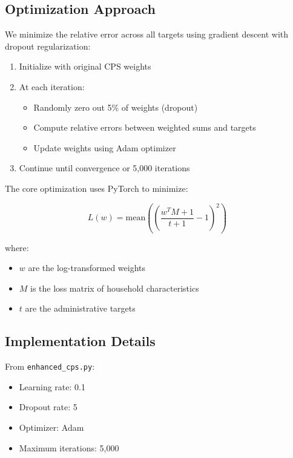 \subsection{Optimization Approach}

We minimize the relative error across all targets using gradient descent with dropout regularization:

\begin{enumerate}
    \item Initialize with original CPS weights
    \item At each iteration:
    \begin{itemize}
        \item Randomly zero out 5\% of weights (dropout)
        \item Compute relative errors between weighted sums and targets
        \item Update weights using Adam optimizer
    \end{itemize}
    \item Continue until convergence or 5,000 iterations
\end{enumerate}

The core optimization uses PyTorch to minimize:

\[
L(w) = \text{mean}\left(\left(\frac{w^T M + 1}{t + 1} - 1\right)^2\right)
\]

where:
\begin{itemize}
    \item $w$ are the log-transformed weights
    \item $M$ is the loss matrix of household characteristics
    \item $t$ are the administrative targets
\end{itemize}

\subsection{Implementation Details}

From \texttt{enhanced_cps.py}:
\begin{itemize}
\item Learning rate: 0.1
\item Dropout rate: 5%
\item Optimizer: Adam
\item Maximum iterations: 5,000
\end{itemize}


